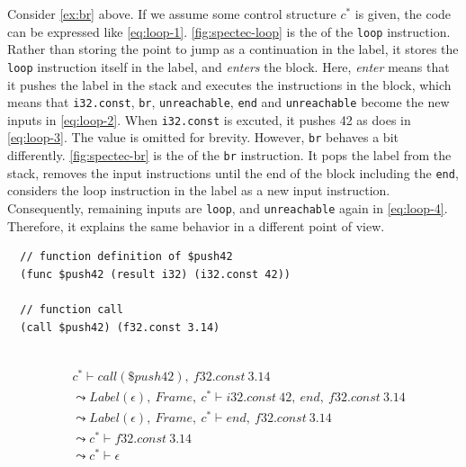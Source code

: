 Consider \cref{ex:br} above.
If we assume some control structure $c^*$ is given, the code can be expressed
like \cref{eq:loop-1}.
\cref{fig:spectec-loop} is the \spectecp{} of the \texttt{loop} instruction.
Rather than storing the point to jump as a continuation in the label, it stores
the \texttt{loop} instruction itself in the label, and \textit{enters} the
block.
Here, \textit{enter} means that it pushes the label in the stack and executes
the instructions in the block, which means that \texttt{i32.const},
\texttt{br}, \texttt{unreachable}, \texttt{end} and \texttt{unreachable} become
the new inputs in \cref{eq:loop-2}.
When \texttt{i32.const} is excuted, it pushes 42 as \officialp{} does
in \cref{eq:loop-3}.
The value is omitted for brevity.
However, \texttt{br} behaves a bit differently.
\cref{fig:spectec-br} is the \spectecp{} of the \texttt{br} instruction.
It pops the label from the stack, removes the input instructions until the end
of the block including the \texttt{end}, considers the loop instruction in the
label as a new input instruction.
Consequently, remaining inputs are \texttt{loop}, and \texttt{unreachable}
again in \cref{eq:loop-4}.
Therefore, it explains the same behavior in a different point of view.


\begin{example}
\label{ex:invoke}
\begin{verbatim}
  // function definition of $push42
  (func $push42 (result i32) (i32.const 42))

  // function call
  (call $push42) (f32.const 3.14)
\end{verbatim}
\end{example}

 \\
\begin{align}
  &c^* \vdash call(\$push42), ~ f32.const ~ 3.14 \label{eq:call-1} \\
&\leadsto
  Label(\epsilon), ~ Frame, ~ c^* \vdash i32.const ~ 42, ~ end, ~ f32.const ~ 3.14 \label{eq:call-2} \\
&\leadsto
  Label(\epsilon), ~ Frame, ~ c^* \vdash end, ~ f32.const ~ 3.14 \label{eq:call-3} \\
&\leadsto
  c^* \vdash f32.const ~ 3.14 \label{eq:call-4} \\
&\leadsto
  c^* \vdash \epsilon \label{eq:call-5}
\end{align}

